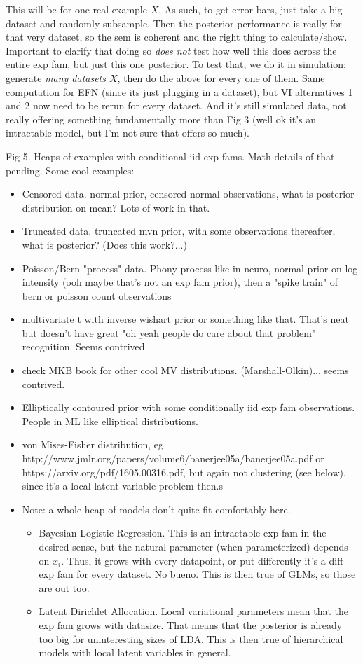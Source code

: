 \documentclass{article}
\begin{document}
This will be for one real example $X$.  As such, to get error bars, just take a big dataset and randomly subsample.  Then the posterior performance is really for that very dataset, so the sem is coherent and the right thing to calculate/show.  Important to clarify that doing so \emph{does not} test how well this does across the entire exp fam, but just this one posterior.  To test that, we do it in simulation: generate \emph{many datasets $X$}, then do the above for every one of them.  Same computation for EFN (since its just plugging in a dataset), but VI alternatives 1 and 2 now need to be rerun for every dataset.  And it's still simulated data, not really offering something fundamentally more than Fig 3 (well ok it's an intractable model, but I'm not sure that offers so much).

Fig 5.  Heaps of examples with conditional iid exp fams.  Math details of that pending.  Some cool examples:
\begin{itemize}
\item Censored data.  normal prior, censored normal observations, what is posterior distribution on mean?  Lots of work in that.
\item Truncated data.  truncated mvn prior, with some observations thereafter, what is posterior? (Does this work?...)
\item Poisson/Bern "process" data.  Phony process like in neuro, normal prior on log intensity (ooh maybe that's not an exp fam prior), then a "spike train" of bern or poisson count observations
\item multivariate t with inverse wishart prior or something like that.  That's neat but doesn't have great "oh yeah people do care about that problem" recognition.  Seems contrived.
\item check MKB book for other cool MV distributions. (Marshall-Olkin)... seems contrived.
\item Elliptically contoured prior with some conditionally iid exp fam observations.  People in ML like elliptical distributions.
\item von Mises-Fisher distribution, eg http://www.jmlr.org/papers/volume6/banerjee05a/banerjee05a.pdf or https://arxiv.org/pdf/1605.00316.pdf, but again not clustering (see below), since it's a local latent variable problem then.s	
\item Note: a whole heap of models don't quite fit comfortably here.
\begin{itemize}
\item Bayesian Logistic Regression.  This is an intractable exp fam in the desired sense, but the natural parameter (when parameterized) depends on $x_i$.  Thus, it grows with every datapoint, or put differently it's a diff exp fam for every dataset.  No bueno.  This is then true of GLMs, so those are out too.
\item Latent Dirichlet Allocation.  Local variational parameters mean that the exp fam grows with datasize.  That means that the posterior is already too big for uninteresting sizes of LDA.  This is then true of hierarchical models with local latent variables in general.   
\end{itemize}

\end{itemize}
\end{document}

